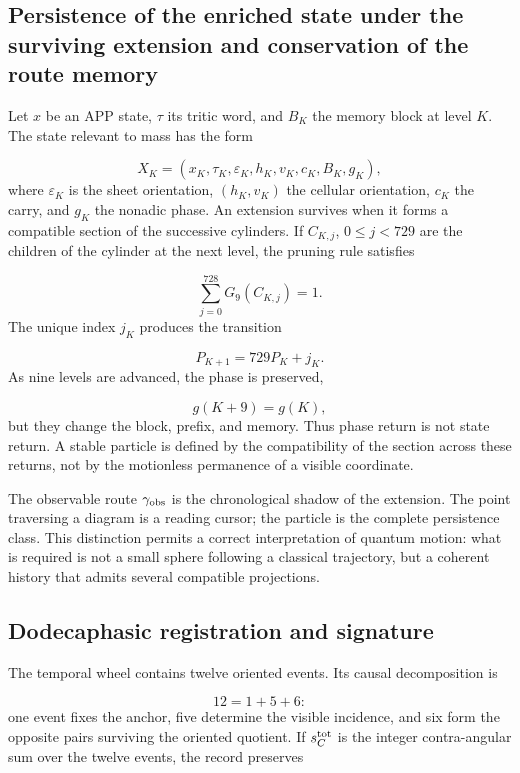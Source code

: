 \subsection{Persistence of the enriched state under the surviving extension and conservation of the route memory}
Let \(x\) be an APP state, \(\tau\) its tritic word, and \(B_K\) the memory block at level \(K\). The state relevant to mass has the form

\[
X_K=(x_K,\tau_K,\varepsilon_K,h_K,v_K,c_K,B_K,g_K),
\]
where \(\varepsilon_K\) is the sheet orientation, \((h_K,v_K)\) the cellular orientation, \(c_K\) the carry, and \(g_K\) the nonadic phase. An extension survives when it forms a compatible section of the successive cylinders. If \(C_{K,j}\), \(0\le j<729\) are the children of the cylinder at the next level, the pruning rule satisfies

\[
\sum_{j=0}^{728}G_9(C_{K,j})=1.
\]
The unique index \(j_K\) produces the transition

\[
P_{K+1}=729P_K+j_K.
\]
As nine levels are advanced, the phase is preserved,

\[
g(K+9)=g(K),
\]
but they change the block, prefix, and memory. Thus phase return is not state return. A stable particle is defined by the compatibility of the section across these returns, not by the motionless permanence of a visible coordinate.

The observable route \(\gamma_{\rm obs}\) is the chronological shadow of the extension. The point traversing a diagram is a reading cursor; the particle is the complete persistence class. This distinction permits a correct interpretation of quantum motion: what is required is not a small sphere following a classical trajectory, but a coherent history that admits several compatible projections.

\subsection{Dodecaphasic registration and signature}
The temporal wheel contains twelve oriented events. Its causal decomposition is

\[
12=1+5+6:
\]
one event fixes the anchor, five determine the visible incidence, and six form the opposite pairs surviving the oriented quotient. If \(s_C^{\rm tot}\) is the integer contra-angular sum over the twelve events, the record preserves

